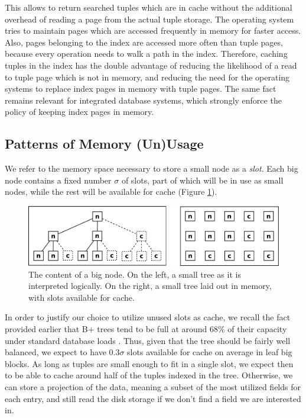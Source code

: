 \documentclass{article}
\begin{document}
This allows to return searched tuples which are in cache without the additional
overhead of reading a page from
the actual tuple storage.
The operating system tries to maintain pages which are accessed frequently in
memory for faster
access.
Also, pages belonging to the index are accessed more often than tuple pages,
because every operation
needs to walk a path in the index.
Therefore, caching tuples in the index has the double advantage of reducing the
likelihood
of a read to tuple page which is not in memory, and reducing the need for the
operating systems
to replace index pages in memory with tuple pages.
The same fact remains relevant for integrated database systems, which strongly
enforce the policy of keeping
index pages in memory.


\subsection{Patterns of Memory (Un)Usage}
We refer to the memory space necessary to store a small node as a \textit{slot}.
Each big node contains a fixed number $\sigma$ of slots, part of which will be
in use
as small nodes, while the rest will be available for cache (Figure
\ref{fig:inner_block}).
\begin{figure}[h]
\begin{center}
\includegraphics[width=350pt]{inner_block}
\end{center}
\caption{
The content of a big node.
On the left, a small tree as it is interpreted logically.
On the right, a small tree laid out in memory, with slots available for cache.
}
\label{fig:inner_block}
\end{figure}

In order to justify our choice to utilize unused slots as cache,
we recall the fact provided earlier that
B+ trees tend to be full at around 68\% of their capacity under standard
database loads \citep{Wu:2011}.
Thus, given that the tree should be fairly well balanced,
we expect to have $0.3 \sigma$ slots available for cache on average in leaf big
blocks.
As long as tuples are small enough to fit in a single slot,
we expect then to be able to cache around half of the tuples indexed in the
tree.
Otherwise, we can store a projection of the data, meaning a subset of the most
utilized fields for each entry,
and still read the disk storage if we don't find a field we are interested in.
\end{document}
